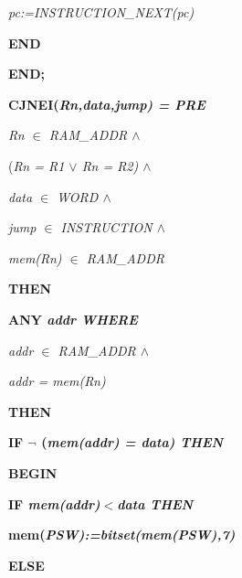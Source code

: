 \begin{sloppypar}
\hspace*{0.30in}\it pc\rm :=\it INSTRUCTION\_NEXT\rm (\it pc\rm )

\hspace*{0.20in}\bf END

\hspace*{0.10in}\bf END\rm ;

\hspace*{0.10in}  

\hspace*{0.10in}\bf CJNEI\rm (\it Rn\rm ,\it data\rm ,\it jump\rm ) \rm = \bf PRE

\hspace*{0.20in}\it Rn $\in$  \it RAM\_ADDR  $\land$ 

\hspace*{0.20in}\rm (\it Rn \rm = \it R1  $\lor$  \it Rn \rm = \it R2\rm )  $\land$ 

\hspace*{0.20in}\it data $\in$  \it WORD  $\land$ 

\hspace*{0.20in}\it jump $\in$  \it INSTRUCTION  $\land$ 

\hspace*{0.20in}\it mem\rm (\it Rn\rm ) $\in$  \it RAM\_ADDR

\hspace*{0.10in}\bf THEN

\hspace*{0.20in}\bf ANY \it addr \bf WHERE

\hspace*{0.30in}\it addr $\in$  \it RAM\_ADDR  $\land$ 

\hspace*{0.30in}\it addr \rm = \it mem\rm (\it Rn\rm )

\hspace*{0.20in}\bf THEN

\hspace*{0.30in}\bf IF  $\neg$ \rm (\it mem\rm (\it addr\rm ) \rm = \it data\rm ) \bf THEN

\hspace*{0.40in}\bf BEGIN

\hspace*{0.50in}\bf IF \it mem\rm (\it addr\rm )$<$\it data \bf THEN

\hspace*{0.60in}\bf mem\rm (\it PSW\rm )\rm :=\it bitset\rm (\it mem\rm (\it PSW\rm )\rm ,\rm 7\rm )

\hspace*{0.50in}\bf ELSE


\end{sloppypar}
